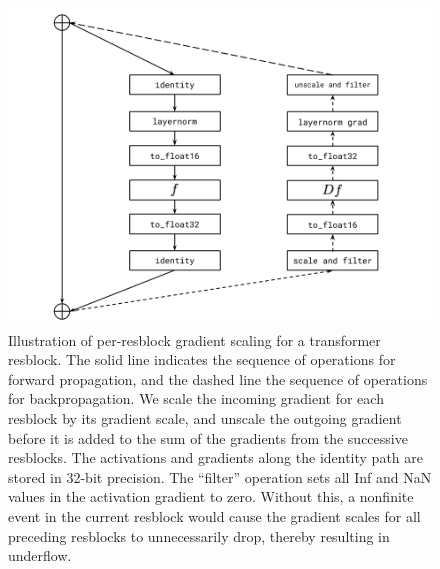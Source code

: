 \documentclass{article}
\begin{document}
\begin{figure}[t]
    \centering
    \includegraphics[width=\linewidth]{per_resblock_scaling.png}
    \caption{Illustration of per-resblock gradient scaling for a transformer resblock. The solid line indicates the sequence of operations for forward propagation, and the dashed line the sequence of operations for backpropagation. We scale the incoming gradient for each resblock by its gradient scale, and unscale the outgoing gradient before it is added to the sum of the gradients from the successive resblocks. The activations and gradients along the identity path are stored in 32-bit precision. The ``filter'' operation sets all Inf and NaN values in the activation gradient to zero. Without this, a nonfinite event in the current resblock would cause the gradient scales for all preceding resblocks to unnecessarily drop, thereby resulting in underflow.}
    \label{fig:grad_scaling}
\end{figure}
\end{document}
